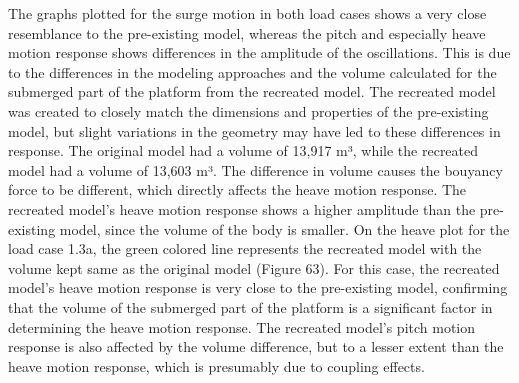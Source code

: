 \documentclass[a4paper, 11pt]{article}
\begin{document}
The graphs plotted for the surge motion in both load cases shows a very close resemblance to the pre-existing model, whereas the pitch and especially heave motion response shows differences in the amplitude of the oscillations. This is due to the differences in the modeling approaches and the volume calculated for the submerged part of the platform from the recreated model. The recreated model was created to closely match the dimensions and properties of the pre-existing model, but slight variations in the geometry may have led to these differences in response. The original model had a volume of 13,917 m³, while the recreated model had a volume of 13,603 m³. The difference in volume causes the bouyancy force to be different, which directly affects the heave motion response. The recreated model's heave motion response shows a higher amplitude than the pre-existing model, since the volume of the body is smaller. On the heave plot for the load case 1.3a, the green colored line represents the recreated model with the volume kept same as the original model (Figure 63). For this case, the recreated model's heave motion response is very close to the pre-existing model, confirming that the volume of the submerged part of the platform is a significant factor in determining the heave motion response. The recreated model's pitch motion response is also affected by the volume difference, but to a lesser extent than the heave motion response, which is presumably due to coupling effects.
\end{document}
